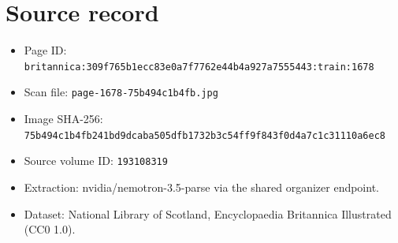 \documentclass{article}
\begin{document}
\section*{Source record}
\begin{itemize}
\item Page ID: \texttt{britannica:309f765b1ecc83e0a7f7762e44b4a927a7555443:train:1678}
\item Scan file: \texttt{page-1678-75b494c1b4fb.jpg}
\item Image SHA-256: \texttt{75b494c1b4fb241bd9dcaba505dfb1732b3c54ff9f843f0d4a7c1c31110a6ec8}
\item Source volume ID: \texttt{193108319}
\item Extraction: nvidia/nemotron-3.5-parse via the shared organizer endpoint.
\item Dataset: National Library of Scotland, Encyclopaedia Britannica Illustrated (CC0 1.0).
\end{itemize}
\end{document}
